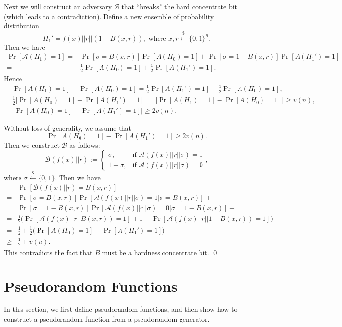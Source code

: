 \documentclass[12pt]{tufte-book}
\newcommand{\ma}{\mathcal{A}}
\begin{document}
Next we will construct an adversary $\mathcal{B}$ that ``breaks'' the hard concentrate bit (which leads to a contradiction).
Define a new ensemble of probability distribution
\[
H_1' = f(x) || r || (1-B(x, r)) , \text{ where } x, r \xleftarrow{\$} \{0, 1\}^n.
\]
Then we have
\begin{align*}
\Pr[\ma(H_1) = 1]
=& \Pr[\sigma = B(x, r)] \Pr[A(H_0) = 1] + \Pr[\sigma = 1 - B(x, r)] \Pr[A(H_1') = 1]\\
=& \frac{1}{2} \Pr[A(H_0) = 1] + \frac{1}{2}\Pr[A(H_1') = 1].
\end{align*}
Hence
\begin{align*}
&\Pr[A(H_1) = 1] - \Pr[A(H_0) = 1]
=  \frac{1}{2}\Pr[A(H_1') = 1] - \frac{1}{2} \Pr[A(H_0) = 1],
\\
&\frac{1}{2} \left|\Pr[A(H_0) = 1] - \Pr[A(H_1') = 1] \right|
= \left| \Pr[A(H_1) = 1] - \Pr[A(H_0) = 1] \right|
\geq v(n),
\\
&\left|\Pr[A(H_0) = 1] - \Pr[A(H_1') = 1] \right|
\geq 2v(n).
\end{align*}

Without loss of generality, we assume that
\[
\Pr[A(H_0) = 1] - \Pr[A(H_1') = 1]
\geq 2v(n).
\]
Then we construct $\mathcal{B}$ as follows:
\[
\mathcal{B}(f(x)|| r) :=
\begin{cases}
\sigma, & \text{if } \ma(f(x)|| r||\sigma) = 1\\
1 - \sigma, & \text{if } \ma(f(x)||r|| \sigma) = 0
\end{cases},
\]
where $\sigma \xleftarrow{\$} \{0, 1\}$.
Then we have
\begin{align*}
& \Pr[\mathcal{B}(f(x)|| r) = B(x, r)]\\
=& \Pr[\sigma = B(x, r)] \Pr[ \ma(f(x)|| r||\sigma)=1 | \sigma = B(x, r)] + \\
& \Pr[\sigma = 1 - B(x, r)] \Pr[ \ma(f(x)|| r||\sigma) = 0 | \sigma = 1- B(x, r)] + \\
=& \frac{1}{2} \big( \Pr[\ma(f(x)||r||B(x, r)) = 1] + 1 - \Pr[\ma(f(x)|| r|| 1- B(x, r)) = 1] \big)\\
=& \frac{1}{2} + \frac{1}{2} \big( \Pr[A(H_0) = 1] - \Pr[A(H_1') = 1] \big)\\
\geq & \frac{1}{2} + v(n).
\end{align*}
This contradicts the fact that $B$ must be a hardness concentrate bit.
\qed


\section{Pseudorandom Functions}
In this section, we first define pseudorandom functions, and then show how to  construct a pseudorandom function from a pseudorandom generator.
\end{document}
